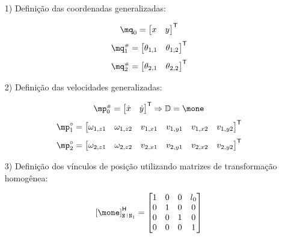 \documentclass[a4paper,11pt,brazil,fleqn]{article}
\begin{document}
\begin{itemize}
\item[1)] Defini\c{c}\~ao das coordenadas generalizadas:

\begin{equation}
\mq_0 = \begin{bmatrix}
x & y
\end{bmatrix}^\msT
\end{equation}
\begin{equation}
\mq_1\ssh = \begin{bmatrix}
\theta_{1,1} &
\theta_{1,2} 
\end{bmatrix}^\msT
\end{equation}
\begin{equation}
\mq_2\ssh = \begin{bmatrix}
\theta_{2,1} &
\theta_{2,2}
\end{bmatrix}^\msT
\end{equation}

\item[2)] Defini\c{c}\~ao das velocidades generalizadas:

\begin{equation}
\mp_0\ssh = \begin{bmatrix}
\dot{x} & \dot{y} \\
\end{bmatrix}^\msT
\Rightarrow \mD = \mone
\end{equation}
\begin{equation}
\mp_1\cir = \begin{bmatrix}
\omega_{1,z1} & \omega_{1,z2} & v_{1,x1} & v_{1,y1} & v_{1,x2} & v_{1,y2}
\end{bmatrix}^\msT
\end{equation}
\begin{equation}
\mp_2\cir = \begin{bmatrix}
\omega_{2,z1} & \omega_{2,z2} & v_{2,x1} & v_{2,y1} & v_{2,x2} & v_{2,y2}
\end{bmatrix}^\msT
\end{equation}

\item[3)] Defini\c{c}\~ao dos v\'inculos de posi\c{c}\~ao utilizando matrizes de transforma\c{c}\~ao homog\^enea:

\begin{equation}
\hvct{\mone}_{\ttN \rl \ttN_1} =
\begin{bmatrix}
1 & 0 & 0 & l_0 \\
0 & 1 & 0 & 0 \\
0 & 0 & 1 & 0 \\
0 & 0 & 0 & 1
\end{bmatrix}
\end{equation}


\end{itemize}
\end{document}
